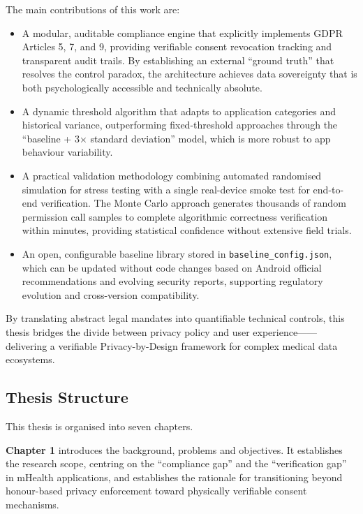 The main contributions of this work are:

\begin{itemize}
\item A modular, auditable compliance engine that explicitly implements GDPR Articles 5, 7, and 9, providing verifiable consent revocation tracking and transparent audit trails. By establishing an external ``ground truth'' that resolves the control paradox, the architecture achieves data sovereignty that is both psychologically accessible and technically absolute.
\item A dynamic threshold algorithm that adapts to application categories and historical variance, outperforming fixed-threshold approaches through the ``baseline + 3× standard deviation'' model, which is more robust to app behaviour variability.
\item A practical validation methodology combining automated randomised simulation for stress testing with a single real-device smoke test for end-to-end verification. The Monte Carlo approach generates thousands of random permission call samples to complete algorithmic correctness verification within minutes, providing statistical confidence without extensive field trials.
\item An open, configurable baseline library stored in \texttt{baseline\_config.json}, which can be updated without code changes based on Android official recommendations and evolving security reports, supporting regulatory evolution and cross-version compatibility.
\end{itemize}

By translating abstract legal mandates into quantifiable technical controls, this thesis bridges the divide between privacy policy and user experience——delivering a verifiable Privacy-by-Design framework for complex medical data ecosystems.

\subsection{Thesis Structure}

This thesis is organised into seven chapters.

\textbf{Chapter 1} introduces the background, problems and objectives. It establishes the research scope, centring on the ``compliance gap'' and the ``verification gap'' in mHealth applications, and establishes the rationale for transitioning beyond honour-based privacy enforcement toward physically verifiable consent mechanisms.

